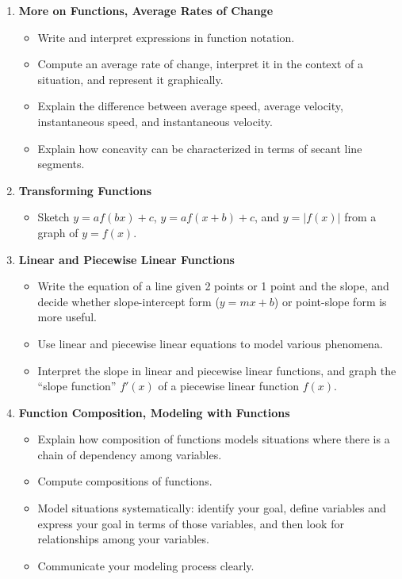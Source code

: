\documentclass{article}
\begin{document}
\begin{enumerate}
\item \textbf{More on Functions, Average Rates of Change} %
\begin{itemize}

\item Write and interpret expressions in function notation.

\item Compute an average rate of change, interpret it in the context of a situation, and represent it graphically.

\item Explain the difference between average speed, average velocity, instantaneous speed, and instantaneous velocity.

\item Explain how concavity can be characterized in terms of secant line segments.

\end{itemize}

\item \textbf{Transforming Functions} %
\begin{itemize}
\item Sketch $y = a f(bx) + c$, $y = a f(x + b) + c$, and $y = |f(x)|$
  from a graph of $y = f(x)$.

\end{itemize}

\item \textbf{Linear and Piecewise Linear Functions} %
\begin{itemize} 
\item Write the equation of a line given 2 points or 1 point and the
  slope, and decide whether slope-intercept form ($y = mx + b$) or
  point-slope form is more useful. 

\item Use linear and piecewise linear equations to model various
  phenomena.

\item Interpret the slope in linear and piecewise linear functions, 
  and graph the ``slope function'' $f'(x)$ of a piecewise linear
  function $f(x)$.  

\end{itemize}

\item \textbf{Function Composition, Modeling with Functions} %
\begin{itemize}
\item Explain how composition of functions models situations where there is a chain of dependency among variables.

\item Compute compositions of functions.

\item Model situations systematically: identify your goal, define variables and express your goal in terms of those variables, and then look for relationships among your variables.

\item Communicate your modeling process clearly. 
\end{itemize}

\end{enumerate}
\end{document}
